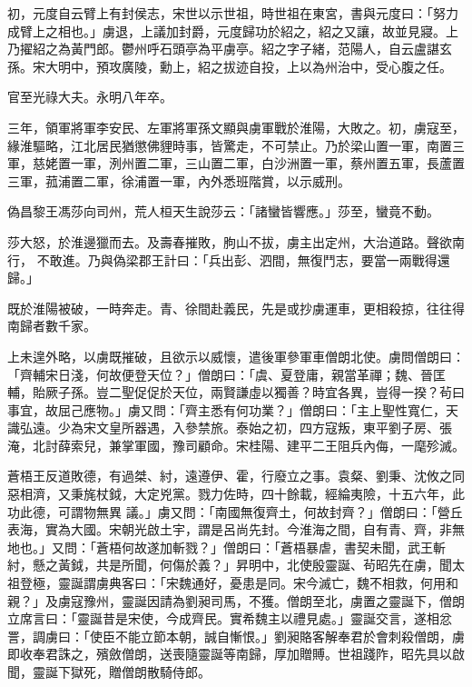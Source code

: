 \begin{pinyinscope}
 初，元度自云臂上有封侯志，宋世以示世祖，時世祖在東宮，書與元度曰：「努力成臂上之相也。」虜退，上議加封爵，元度歸功於紹之，紹之又讓，故並見寢。上乃擢紹之為黃門郎。鬱州呼石頭亭為平虜亭。紹之字子緒，范陽人，自云盧諶玄孫。宋大明中，預攻廣陵，勳上，紹之拔迹自投，上以為州治中，受心腹之任。



 官至光祿大夫。永明八年卒。



 三年，領軍將軍李安民、左軍將軍孫文顯與虜軍戰於淮陽，大敗之。初，虜寇至，緣淮驅略，江北居民猶懲佛貍時事，皆驚走，不可禁止。乃於梁山置一軍，南置三軍，慈姥置一軍，洌州置二軍，三山置二軍，白沙洲置一軍，蔡州置五軍，長蘆置三軍，菰浦置二軍，徐浦置一軍，內外悉班階賞，以示威刑。



 偽昌黎王馮莎向司州，荒人桓天生說莎云：「諸蠻皆響應。」莎至，蠻竟不動。



 莎大怒，於淮邊獵而去。及壽春摧敗，朐山不拔，虜主出定州，大治道路。聲欲南行，
 不敢進。乃與偽梁郡王計曰：「兵出彭、泗間，無復鬥志，要當一兩戰得還歸。」



 既於淮陽被破，一時奔走。青、徐間赴義民，先是或抄虜運車，更相殺掠，往往得南歸者數千家。



 上未遑外略，以虜既摧破，且欲示以威懷，遣後軍參軍車僧朗北使。虜問僧朗曰：「齊輔宋日淺，何故便登天位？」僧朗曰：「虞、夏登庸，親當革禪；魏、晉匡輔，貽厥子孫。豈二聖促促於天位，兩賢謙虛以獨善？時宜各異，豈得一揆？茍曰事宜，故屈己應物。」虜又問：「齊主悉有何功業？」僧朗曰：「主上聖性寬仁，天識弘遠。少為宋文皇所器遇，入參禁旅。泰始之初，四方寇叛，東平劉子房、張淹，北討薛索兒，兼掌軍國，豫司顧命。宋桂陽、建平二王阻兵內侮，一麾殄滅。



 蒼梧王反道敗德，有過桀、紂，遠遵伊、霍，行廢立之事。袁粲、劉秉、沈攸之同惡相濟，又秉旄杖鉞，大定兇黨。戮力佐時，四十餘載，經綸夷險，十五六年，此功此德，可謂物無異
 議。」虜又問：「南國無復齊土，何故封齊？」僧朗曰：「營丘表海，實為大國。宋朝光啟土宇，謂是呂尚先封。今淮海之間，自有青、齊，非無地也。」又問：「蒼梧何故遂加斬戮？」僧朗曰：「蒼梧暴虐，書契未聞，武王斬紂，懸之黃鉞，共是所聞，何傷於義？」昇明中，北使殷靈誕、茍昭先在虜，聞太祖登極，靈誕謂虜典客曰：「宋魏通好，憂患是同。宋今滅亡，魏不相救，何用和親？」及虜寇豫州，靈誕因請為劉昶司馬，不獲。僧朗至北，虜置之靈誕下，僧朗立席言曰：「靈誕昔是宋使，今成齊民。實希魏主以禮見處。」靈誕交言，遂相忿詈，調虜曰：「使臣不能立節本朝，誠自慚恨。」劉昶賂客解奉君於會刺殺僧朗，虜即收奉君誅之，殯斂僧朗，送喪隨靈誕等南歸，厚加贈賻。世祖踐阼，昭先具以啟聞，靈誕下獄死，贈僧朗散騎侍郎。




\end{pinyinscope}
